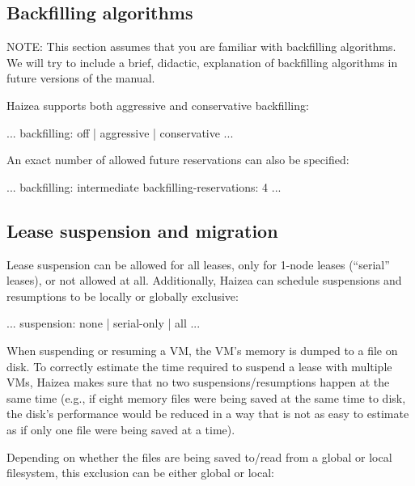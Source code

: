 \subsection{Backfilling algorithms}

\begin{warning}
NOTE: This section assumes that you are familiar with backfilling algorithms. We will try to include a brief, didactic, explanation of backfilling algorithms in future versions of the manual.
\end{warning}

Haizea supports both aggressive and conservative backfilling:

\begin{wideshellverbatim}
[scheduling]
...
backfilling: off | aggressive | conservative
...
\end{wideshellverbatim}

An exact number of allowed future reservations can also be specified:

\begin{wideshellverbatim}
[scheduling]
...
backfilling: intermediate
backfilling-reservations: 4
...
\end{wideshellverbatim}


\subsection{Lease suspension and migration}

Lease suspension can be allowed for all leases, only for 1-node leases (``serial'' leases), or not allowed at all. Additionally, Haizea can schedule suspensions and resumptions to be locally or globally exclusive:

\begin{wideshellverbatim}
[scheduling]
...
suspension: none | serial-only | all
...
\end{wideshellverbatim}

When suspending or resuming a VM, the VM's memory is dumped to a
file on disk. To correctly estimate the time required to suspend
a lease with multiple VMs, Haizea makes sure that no two 
suspensions/resumptions happen at the same time (e.g., if eight
memory files were being saved at the same time to disk, the disk's
performance would be reduced in a way that is not as easy to estimate
as if only one file were being saved at a time).
            
Depending on whether the files are being saved to/read from a global
or local filesystem, this exclusion can be either global or local:

